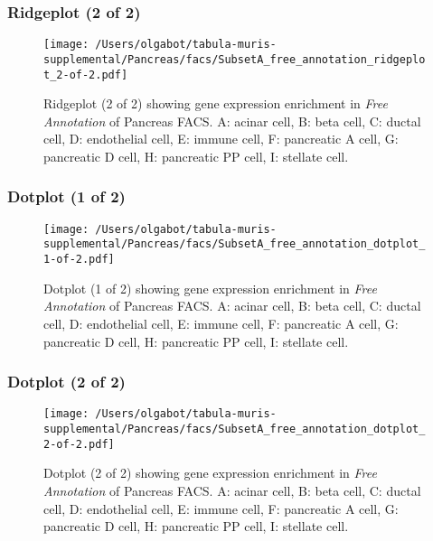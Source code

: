 \clearpage

\subsubsection{Ridgeplot (2 of 2)}
\begin{figure}[h]
\centering
\texttt{[image: /Users/olgabot/tabula-muris-supplemental/Pancreas/facs/SubsetA\_free\_annotation\_ridgeplot\_2-of-2.pdf]}

\caption{ Ridgeplot (2 of 2)  showing gene expression enrichment in \emph{Free Annotation} of Pancreas FACS. A: acinar cell, B: beta cell, C: ductal cell, D: endothelial cell, E: immune cell, F: pancreatic A cell, G: pancreatic D cell, H: pancreatic PP cell, I: stellate cell.}
\end{figure}


\clearpage

\subsubsection{Dotplot (1 of 2)}
\begin{figure}[h]
\centering
\texttt{[image: /Users/olgabot/tabula-muris-supplemental/Pancreas/facs/SubsetA\_free\_annotation\_dotplot\_1-of-2.pdf]}

\caption{ Dotplot (1 of 2)  showing gene expression enrichment in \emph{Free Annotation} of Pancreas FACS. A: acinar cell, B: beta cell, C: ductal cell, D: endothelial cell, E: immune cell, F: pancreatic A cell, G: pancreatic D cell, H: pancreatic PP cell, I: stellate cell.}
\end{figure}


\clearpage

\subsubsection{Dotplot (2 of 2)}
\begin{figure}[h]
\centering
\texttt{[image: /Users/olgabot/tabula-muris-supplemental/Pancreas/facs/SubsetA\_free\_annotation\_dotplot\_2-of-2.pdf]}

\caption{ Dotplot (2 of 2)  showing gene expression enrichment in \emph{Free Annotation} of Pancreas FACS. A: acinar cell, B: beta cell, C: ductal cell, D: endothelial cell, E: immune cell, F: pancreatic A cell, G: pancreatic D cell, H: pancreatic PP cell, I: stellate cell.}
\end{figure}


